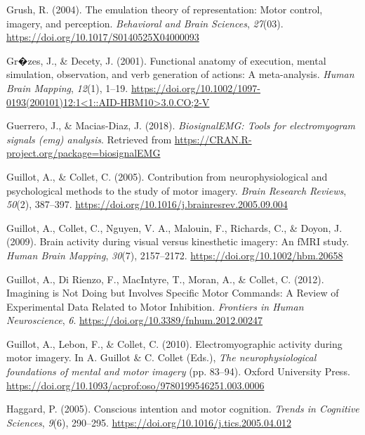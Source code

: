 \documentclass[a4paper,12pt,twoside,openright,oldfontcommands]{memoir}
\begin{document}
\hypertarget{ref-grush_emulation_2004}{}
Grush, R. (2004). The emulation theory of representation: Motor control,
imagery, and perception. \emph{Behavioral and Brain Sciences},
\emph{27}(03). \url{https://doi.org/10.1017/S0140525X04000093}

\hypertarget{ref-grzes_functional_2001}{}
Gr�zes, J., \& Decety, J. (2001). Functional anatomy of execution,
mental simulation, observation, and verb generation of actions: A
meta-analysis. \emph{Human Brain Mapping}, \emph{12}(1), 1--19.
\href{https://doi.org/10.1002/1097-0193(200101)12:1\%3C1::AID-HBM10\%3E3.0.CO;2-V}{https://doi.org/10.1002/1097-0193(200101)12:1\textless{}1::AID-HBM10\textgreater{}3.0.CO;2-V}

\hypertarget{ref-R-biosignalEMG}{}
Guerrero, J., \& Macias-Diaz, J. (2018). \emph{BiosignalEMG: Tools for
electromyogram signals (emg) analysis}. Retrieved from
\url{https://CRAN.R-project.org/package=biosignalEMG}

\hypertarget{ref-guillot_contribution_2005}{}
Guillot, A., \& Collet, C. (2005). Contribution from neurophysiological
and psychological methods to the study of motor imagery. \emph{Brain
Research Reviews}, \emph{50}(2), 387--397.
\url{https://doi.org/10.1016/j.brainresrev.2005.09.004}

\hypertarget{ref-guillot_brain_2009}{}
Guillot, A., Collet, C., Nguyen, V. A., Malouin, F., Richards, C., \&
Doyon, J. (2009). Brain activity during visual versus kinesthetic
imagery: An fMRI study. \emph{Human Brain Mapping}, \emph{30}(7),
2157--2172. \url{https://doi.org/10.1002/hbm.20658}

\hypertarget{ref-guillot_imagining_2012}{}
Guillot, A., Di Rienzo, F., MacIntyre, T., Moran, A., \& Collet, C.
(2012). Imagining is Not Doing but Involves Specific Motor Commands: A
Review of Experimental Data Related to Motor Inhibition. \emph{Frontiers
in Human Neuroscience}, \emph{6}.
\url{https://doi.org/10.3389/fnhum.2012.00247}

\hypertarget{ref-guillot_electromyographic_2010}{}
Guillot, A., Lebon, F., \& Collet, C. (2010). Electromyographic activity
during motor imagery. In A. Guillot \& C. Collet (Eds.), \emph{The
neurophysiological foundations of mental and motor imagery} (pp.
83--94). Oxford University Press.
\url{https://doi.org/10.1093/acprof:oso/9780199546251.003.0006}

\hypertarget{ref-haggard_conscious_2005}{}
Haggard, P. (2005). Conscious intention and motor cognition.
\emph{Trends in Cognitive Sciences}, \emph{9}(6), 290--295.
\url{https://doi.org/10.1016/j.tics.2005.04.012}
\end{document}
